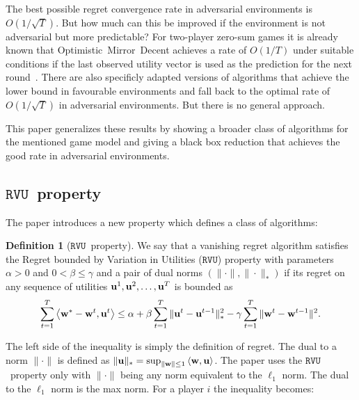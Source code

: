 \documentclass[a4paper]{article}
\theoremstyle{definition}
\newtheorem{defn}[theorem]{Definition}
\newcommand{\myprop}{\ensuremath{\texttt{RVU}}}
\renewcommand{\vec}[1]{\ensuremath{{\bf #1}}}
\newcommand{\dotp}[2]{\ensuremath{\left\langle #1, #2 \right\rangle}}
\begin{document}
The best possible regret convergence rate in adversarial environments is
$O(1/\sqrt{T})$.
But how much can this be improved if the environment is not
adversarial but more predictable?
For two-player zero-sum games it is already known that
Optimistic~Mirror~Decent achieves a rate of $O(1/T)$ under suitable
conditions if the last observed utility vector is used as the
prediction for the next round~\cite{2013arXiv1311.1869R}.
There are also specificly adapted versions of algorithms that achieve
the lower bound in favourable environments and fall back to the
optimal rate of $O(1/\sqrt{T})$ in adversarial environments.
But there is no general approach.

This paper generalizes these results by
showing a broader class of algorithms for the mentioned game model
and giving a black box reduction that achieves the good rate in
adversarial environments.

\subsection{\myprop~property}
\label{sec:myprop}

\setcounter{theorem}{2}

The paper introduces a new property which defines a class of
algorithms:
\begin{defn}[\myprop~property]
  We say that a vanishing regret algorithm satisfies the Regret
  bounded by Variation in Utilities (\myprop) property with parameters
  $\alpha > 0$ and $0 < \beta \leq \gamma$ and a pair of dual norms
  $(\|\cdot\|, \|\cdot\|_*)$  if its regret on any sequence of utilities
  $\vec{u}^1, \vec{u}^2, \ldots, \vec{u}^T$ is bounded as
  \begin{equation*}
    \sum_{t=1}^{T} \dotp{\vec{w}^*- \vec{w}^t}{\vec{u}^t} \leq \alpha
    +\beta \sum_{t=1}^{T} \| \vec{u}^t - \vec{u}^{t-1}\|_*^2 -
    \gamma\sum_{t=1}^{T} \|\vec{w}^{t} - \vec{w}^{t-1}\|^2.
    \label{eqn:reg-form}
  \end{equation*}  
  \label{defn:alg-class}
\end{defn}


The left side of the inequality is simply the definition of regret.
The dual to a norm $\|\cdot\|$ is defined as $\|\vec{u}\|_* = \sup_{\|\vec{w}\|
  \leq 1} \dotp{\vec{w}}{\vec{u}}$.
The paper uses the \myprop~property only with
 $\|\cdot\|$ being any norm equivalent to the
 $\ell_1$ norm.
 The dual to the $\ell_1$ norm is the max norm.
 For a player $i$ the inequality becomes:
\end{document}
